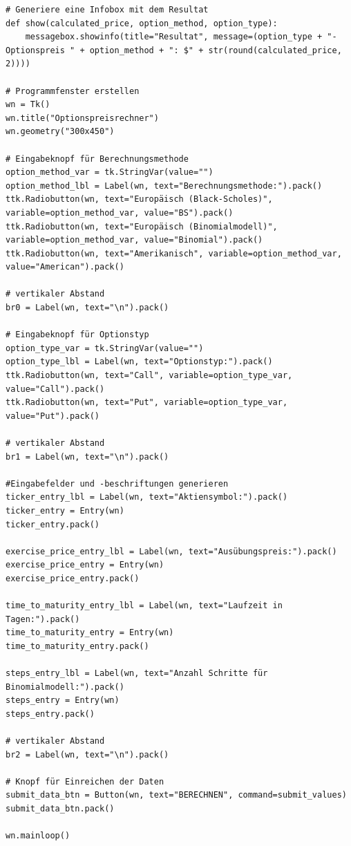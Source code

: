 \documentclass[11pt]{report} %
\begin{document}
\begin{lstlisting}
# Generiere eine Infobox mit dem Resultat
def show(calculated_price, option_method, option_type):
    messagebox.showinfo(title="Resultat", message=(option_type + "-Optionspreis " + option_method + ": $" + str(round(calculated_price, 2))))

# Programmfenster erstellen
wn = Tk()
wn.title("Optionspreisrechner")
wn.geometry("300x450")

# Eingabeknopf für Berechnungsmethode
option_method_var = tk.StringVar(value="")
option_method_lbl = Label(wn, text="Berechnungsmethode:").pack()
ttk.Radiobutton(wn, text="Europäisch (Black-Scholes)", variable=option_method_var, value="BS").pack()
ttk.Radiobutton(wn, text="Europäisch (Binomialmodell)", variable=option_method_var, value="Binomial").pack()
ttk.Radiobutton(wn, text="Amerikanisch", variable=option_method_var, value="American").pack()

# vertikaler Abstand
br0 = Label(wn, text="\n").pack()

# Eingabeknopf für Optionstyp
option_type_var = tk.StringVar(value="")
option_type_lbl = Label(wn, text="Optionstyp:").pack()
ttk.Radiobutton(wn, text="Call", variable=option_type_var, value="Call").pack()
ttk.Radiobutton(wn, text="Put", variable=option_type_var, value="Put").pack()

# vertikaler Abstand
br1 = Label(wn, text="\n").pack()

#Eingabefelder und -beschriftungen generieren
ticker_entry_lbl = Label(wn, text="Aktiensymbol:").pack()
ticker_entry = Entry(wn)
ticker_entry.pack()

exercise_price_entry_lbl = Label(wn, text="Ausübungspreis:").pack()
exercise_price_entry = Entry(wn)
exercise_price_entry.pack()

time_to_maturity_entry_lbl = Label(wn, text="Laufzeit in Tagen:").pack()
time_to_maturity_entry = Entry(wn)
time_to_maturity_entry.pack()

steps_entry_lbl = Label(wn, text="Anzahl Schritte für Binomialmodell:").pack()
steps_entry = Entry(wn)
steps_entry.pack()

# vertikaler Abstand
br2 = Label(wn, text="\n").pack()

# Knopf für Einreichen der Daten
submit_data_btn = Button(wn, text="BERECHNEN", command=submit_values)
submit_data_btn.pack()

wn.mainloop()
\end{lstlisting}
\end{document}
